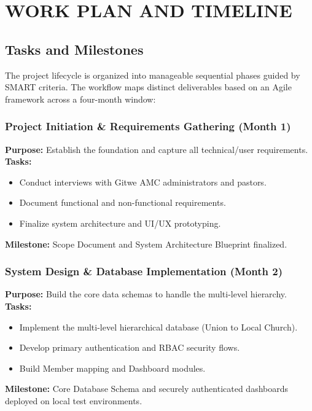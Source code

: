 \documentclass[12pt]{report}
\begin{document}
\chapter{WORK PLAN AND TIMELINE}
\section{Tasks and Milestones}
The project lifecycle is organized into manageable sequential phases guided by SMART criteria. The workflow maps distinct deliverables based on an Agile framework across a four-month window:

\subsection*{Project Initiation \& Requirements Gathering (Month 1)}
\textbf{Purpose:} Establish the foundation and capture all technical/user requirements.\\
\textbf{Tasks:}
\begin{itemize}
    \item Conduct interviews with Gitwe AMC administrators and pastors.
    \item Document functional and non-functional requirements.
    \item Finalize system architecture and UI/UX prototyping.
\end{itemize}
\textbf{Milestone:} Scope Document and System Architecture Blueprint finalized.

\subsection*{System Design \& Database Implementation (Month 2)}
\textbf{Purpose:} Build the core data schemas to handle the multi-level hierarchy.\\
\textbf{Tasks:}
\begin{itemize}
    \item Implement the multi-level hierarchical database (Union to Local Church).
    \item Develop primary authentication and RBAC security flows.
    \item Build Member mapping and Dashboard modules.
\end{itemize}
\textbf{Milestone:} Core Database Schema and securely authenticated dashboards deployed on local test environments.
\end{document}
